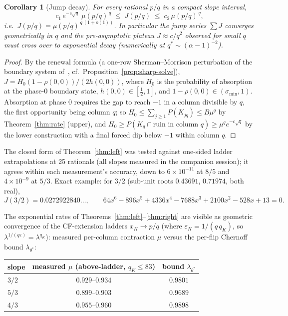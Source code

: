 \documentclass[11pt]{article}
\newtheorem{corollary}[theorem]{Corollary}
\theoremstyle{definition}
\theoremstyle{remark}
\begin{document}
\begin{corollary}[Jump decay]\label{cor:jumpdecay}
For every rational $p/q$ in a compact slope interval,
\[
c_1\, e^{-c\sqrt{q}}\;\mu(p/q)^{\,q}
\;\leq\; J(p/q) \;\leq\;
c_2\, \mu(p/q)^{\,q},
\]
i.e.\ $J(p/q) = \mu(p/q)^{\,q\,(1 + o(1))}$.
In particular the jump series $\sum J$ converges geometrically in $q$
and the pre-asymptotic plateau $J \approx c/q^2$ observed for small $q$
must cross over to exponential decay (numerically at
$q^* \sim (\alpha - 1)^{-2}$).
\end{corollary}

\begin{proof}
By the renewal formula (a one-row Sherman--Morrison perturbation of
the boundary system of~\cite{bridge}, cf.\
Proposition~\ref{prop:sharp-solve}),
$J = H_0 (1 - \rho(0,0))/(2 h(0,0))$, where $H_0$ is the probability
of absorption at the phase-$0$ boundary state, $h(0,0) \in
[\tfrac12, 1]$, and $1 - \rho(0,0) \in (\sigma_{\min}, 1)$.
Absorption at phase $0$ requires the gap to reach $-1$ in a column
divisible by $q$, the first opportunity being column $q$; so
$H_0 \leq \sum_{j \geq 1} P(K_{jq}) \leq B \mu^{q}$ by
Theorem~\ref{thm:rate} (upper), and
$H_0 \geq P(K_q \cap \text{ruin in column } q)
\geq \mu^{q} e^{-c\sqrt{q}}$ by the lower construction with a final
forced dip below $-1$ within column $q$.
\end{proof}

The closed form of Theorem~\ref{thm:left} was tested against one-sided
ladder extrapolations at 25 rationals (all slopes measured in the
companion session); it agrees within each measurement's accuracy,
down to $6 \times 10^{-11}$ at $8/5$ and $4 \times 10^{-9}$ at $5/3$.
Exact example: for $3/2$ (sub-unit roots $0.43691$, $0.71974$, both
real),
\[
J(3/2) = 0.0272922840\ldots,
\qquad
64x^6 - 896x^5 + 4336x^4 - 7688x^3 + 2100x^2 - 528x + 13 = 0 .
\]

The exponential rates of Theorems~\ref{thm:left}--\ref{thm:right} are
visible as geometric convergence of the CF-extension ladders
$x_K \to p/q$ (where $\varepsilon_K = 1/(q\,q_K)$, so
$\lambda^{1/(q\varepsilon)} = \lambda^{q_K}$): measured per-column
contraction $\mu$ versus the per-flip Chernoff bound
$\lambda_{\theta^*}$:

\begin{center}
\begin{tabular}{lcc}
\toprule
slope & measured $\mu$ (above-ladder, $q_K \leq 83$) & bound $\lambda_{\theta^*}$ \\
\midrule
$3/2$ & $0.929$--$0.934$ & $0.9801$ \\
$5/3$ & $0.899$--$0.903$ & $0.9689$ \\
$4/3$ & $0.955$--$0.960$ & $0.9898$ \\
\bottomrule
\end{tabular}
\end{center}
\end{document}
